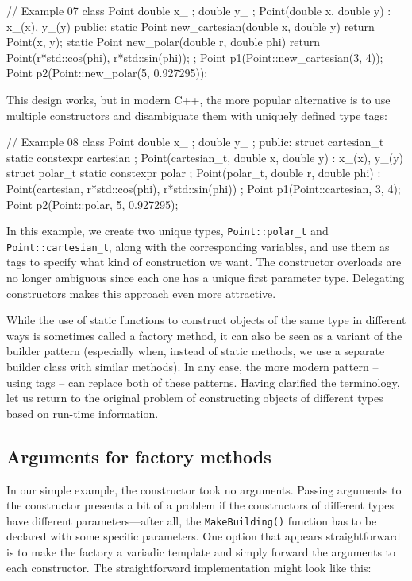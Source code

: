 \begin{code}
// Example 07
class Point {
  double x_ {};
  double y_ {};
  Point(double x, double y) : x_(x), y_(y) {}
  public:
  static Point new_cartesian(double x, double y) {
    return Point(x, y);
  }
  static Point new_polar(double r, double phi) {
    return Point(r*std::cos(phi), r*std::sin(phi));
  }
};
Point p1(Point::new_cartesian(3, 4));
Point p2(Point::new_polar(5, 0.927295));
\end{code}

This design works, but in modern C++, the more popular alternative is to use multiple constructors and disambiguate them with uniquely defined type tags:

\begin{code}
// Example 08
class Point {
  double x_ {};
  double y_ {};
  public:
  struct cartesian_t {} static constexpr cartesian {};
  Point(cartesian_t, double x, double y) : x_(x), y_(y) {}
  struct polar_t {} static constexpr polar {};
  Point(polar_t, double r, double phi) :
    Point(cartesian, r*std::cos(phi), r*std::sin(phi)) {}
};
Point p1(Point::cartesian, 3, 4);
Point p2(Point::polar, 5, 0.927295);
\end{code}

In this example, we create two unique types, \texttt{Point::polar\_t} and \texttt{Point::cartesian\_t}, along with the corresponding variables, and use them as tags to specify what kind of construction we want. The constructor overloads are no longer ambiguous since each one has a unique first parameter type. Delegating constructors makes this approach even more attractive.

While the use of static functions to construct objects of the same type in different ways is sometimes called a factory method, it can also be seen as a variant of the builder pattern (especially when, instead of static methods, we use a separate builder class with similar methods). In any case, the more modern pattern -- using tags -- can replace both of these patterns. Having clarified the terminology, let us return to the original problem of constructing objects of different types based on run-time information.

\subsection{Arguments for factory methods}

In our simple example, the constructor took no arguments. Passing arguments to the constructor presents a bit of a problem if the constructors of different types have different parameters---after all, the \texttt{MakeBuilding()} function has to be declared with some specific parameters. One option that appears straightforward is to make the factory a variadic template and simply forward the arguments to each constructor. The straightforward implementation might look like this:

